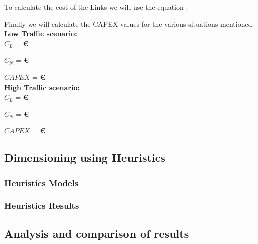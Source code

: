 	



To calculate the cost of the Links we will use the equation .

	

Finally we will calculate the CAPEX values for the various situations mentioned.\\

\textbf{Low Traffic scenario:}\\

$C_L$ = \textbf{\euro}

$C_N$ = \textbf{\euro}

$CAPEX$ = \textbf{\euro}\\

\textbf{High Traffic scenario:}\\

$C_L$ = \textbf{\euro}

$C_N$ = \textbf{ \euro}

$CAPEX$ =  \textbf{ \euro}\\



\subsection{Dimensioning using Heuristics}

\subsubsection{Heuristics Models}

\subsubsection{Heuristics Results}

\subsection{Analysis and comparison of results}
